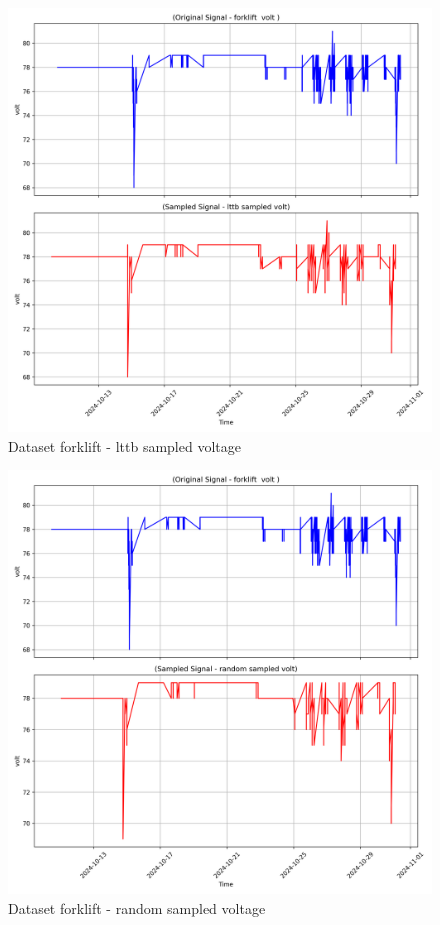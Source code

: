 \begin{figure}
    \centering
    \includegraphics[width=1\linewidth]{screenshots/forklift/lttb_sampled_volt_screenshot.png}
    \caption{Dataset forklift - lttb sampled voltage }
    \label{fig:forklift_lttb_sampled_volt_screenshot}
\end{figure}
\begin{figure}
    \centering
    \includegraphics[width=1\linewidth]{screenshots/forklift/random_sampled_volt_screenshot.png}
    \caption{Dataset forklift - random sampled voltage }
    \label{fig:forklift_random_sampled_volt_screenshot}
\end{figure}
